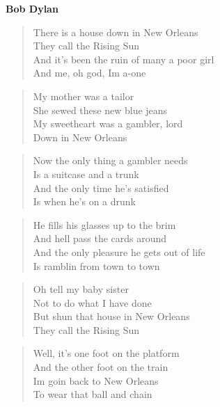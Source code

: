 \documentclass[9pt,a4paper,oneside, onecolumn]{article}
\begin{document}
\begin{multicols}{2}
\columnbreak
\textbf{Bob Dylan}

\begin{verse}
There is a house down in New Orleans\\
They call the Rising Sun\\
And it's been the ruin of many a poor girl\\
And me, oh god, Im a-one\\
\end{verse}

\begin{verse}
My mother was a tailor\\
She sewed these new blue jeans\\
My sweetheart was a gambler, lord\\
Down in New Orleans\\
\end{verse}

\begin{verse}
Now the only thing a gambler needs\\
Is a suitcase and a trunk\\
And the only time he's satisfied\\
Is when he's on a drunk\\
\end{verse}

\begin{verse}
He fills his glasses up to the brim\\
And hell pass the cards around\\
And the only pleasure he gets out of life\\
Is ramblin from town to town\\
\end{verse}

\begin{verse}
Oh tell my baby sister\\
Not to do what I have done\\
But shun that house in New Orleans\\
They call the Rising Sun\\
\end{verse}

\begin{verse}
Well, it's one foot on the platform\\
And the other foot on the train\\
Im goin back to New Orleans\\
To wear that ball and chain\\
\end{verse}


\end{multicols}
\end{document}
